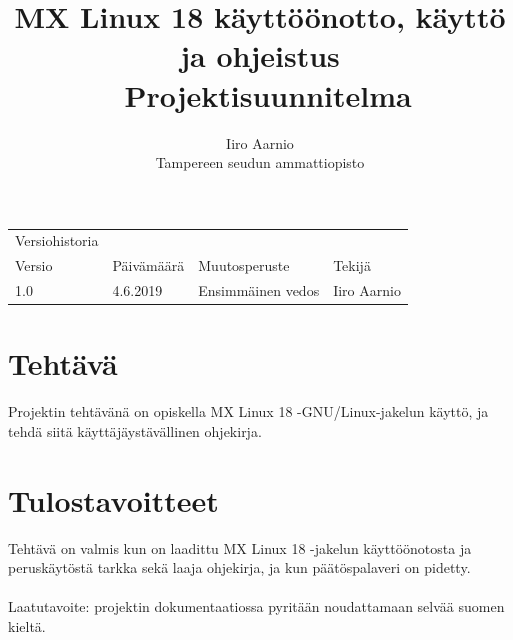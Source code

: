 \documentclass[a4paper, 12pt, finnish]{article}
\begin{document}
\title{MX Linux 18 käyttöönotto, käyttö ja ohjeistus \\ \large Projektisuunnitelma}
\author{Iiro Aarnio\\ Tampereen seudun ammattiopisto}
\maketitle
\thispagestyle{empty}
\newpage
\thispagestyle{empty}
\newpage
\begin{table}[htpb]
\begin{tabular}{llll}
Versiohistoria &            &                         &             \\
\rowcolor[HTML]{FFCCC9}
Versio         & Päivämäärä & Muutosperuste           & Tekijä      \\
1.0              & 4.6.2019   & Ensimmäinen vedos       & Iiro Aarnio \\
\end{tabular}
\end{table}

\newpage
\thispagestyle{empty}
\tableofcontents
\newpage
\section{Tehtävä}
Projektin tehtävänä on opiskella MX Linux 18 -GNU/Linux-jakelun käyttö, ja tehdä siitä käyttäjäystävällinen ohjekirja. 

\section{Tulostavoitteet}
Tehtävä on valmis kun on laadittu MX Linux 18 -jakelun käyttöönotosta ja peruskäytöstä tarkka sekä laaja ohjekirja, ja kun päätöspalaveri on pidetty.
\\\\
Laatutavoite: projektin dokumentaatiossa pyritään noudattamaan selvää suomen kieltä.
\end{document}

